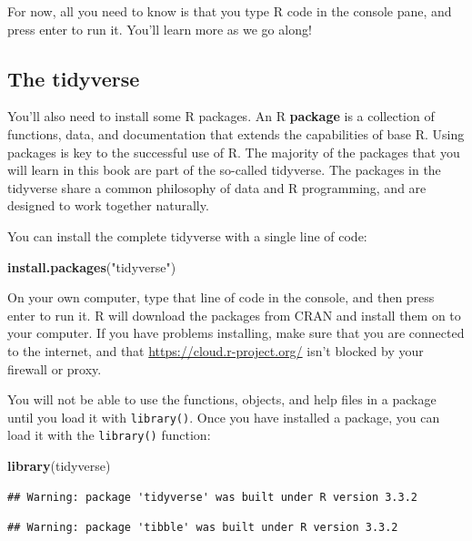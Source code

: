 \documentclass[]{book}
\newenvironment{Shaded}{\begin{snugshade}}{\end{snugshade}}
\newcommand{\KeywordTok}[1]{\textcolor[rgb]{0.13,0.29,0.53}{\textbf{{#1}}}}
\newcommand{\StringTok}[1]{\textcolor[rgb]{0.31,0.60,0.02}{{#1}}}
\newcommand{\NormalTok}[1]{{#1}}
\theoremstyle{definition}
\theoremstyle{definition}
\theoremstyle{remark}
\begin{document}
For now, all you need to know is that you type R code in the console
pane, and press enter to run it. You'll learn more as we go along!

\subsection{The tidyverse}\label{the-tidyverse}

You'll also need to install some R packages. An R \textbf{package} is a
collection of functions, data, and documentation that extends the
capabilities of base R. Using packages is key to the successful use of
R. The majority of the packages that you will learn in this book are
part of the so-called tidyverse. The packages in the tidyverse share a
common philosophy of data and R programming, and are designed to work
together naturally.

You can install the complete tidyverse with a single line of code:

\begin{Shaded}
\begin{Highlighting}[]
\KeywordTok{install.packages}\NormalTok{(}\StringTok{"tidyverse"}\NormalTok{)}
\end{Highlighting}
\end{Shaded}

On your own computer, type that line of code in the console, and then
press enter to run it. R will download the packages from CRAN and
install them on to your computer. If you have problems installing, make
sure that you are connected to the internet, and that
\url{https://cloud.r-project.org/} isn't blocked by your firewall or
proxy.

You will not be able to use the functions, objects, and help files in a
package until you load it with \texttt{library()}. Once you have
installed a package, you can load it with the \texttt{library()}
function:

\begin{Shaded}
\begin{Highlighting}[]
\KeywordTok{library}\NormalTok{(tidyverse)}
\end{Highlighting}
\end{Shaded}

\begin{verbatim}
## Warning: package 'tidyverse' was built under R version 3.3.2
\end{verbatim}

\begin{verbatim}
## Warning: package 'tibble' was built under R version 3.3.2
\end{verbatim}
\end{document}
